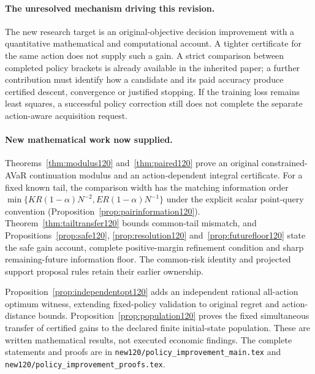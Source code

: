 \paragraph{The unresolved mechanism driving this revision.}
The new research target is an original-objective decision improvement with a quantitative mathematical and computational account. A tighter certificate for the same action does not supply such a gain. A strict comparison between completed policy brackets is already available in the inherited paper; a further contribution must identify how a candidate and its paid accuracy produce certified descent, convergence or justified stopping. If the training loss remains least squares, a successful policy correction still does not complete the separate action-aware acquisition request.

\paragraph{New mathematical work now supplied.}
Theorems~\ref{thm:modulus120} and~\ref{thm:paired120} prove an original
constrained-AVaR continuation modulus and an action-dependent integral
certificate. For a fixed known tail, the comparison width has the matching
information order
$\min\{KR(1-\alpha)N^{-2},ER(1-\alpha)N^{-1}\}$ under the explicit scalar
point-query convention (Proposition~\ref{prop:pairinformation120}).
Theorem~\ref{thm:tailtransfer120} bounds common-tail mismatch, and
Propositions~\ref{prop:safe120}, \ref{prop:resolution120}
and~\ref{prop:futurefloor120} state the safe gain account, complete
positive-margin refinement condition and sharp remaining-future
information floor. The common-risk identity and projected support
proposal rules retain their earlier ownership.

Proposition~\ref{prop:independentopt120} adds an independent rational
all-action optimum witness, extending fixed-policy validation to original
regret and action-distance bounds. Proposition~\ref{prop:population120}
proves the fixed simultaneous transfer of certified gains to the declared
finite initial-state population. These are written mathematical results,
not executed economic findings. The complete statements and proofs are in
\nolinkurl{new120/policy_improvement_main.tex} and
\nolinkurl{new120/policy_improvement_proofs.tex}.

